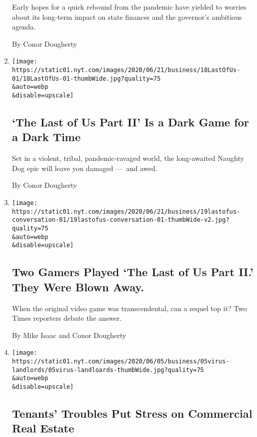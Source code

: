 \begin{enumerate}
  Early hopes for a quick rebound from the pandemic have yielded to
  worries about its long-term impact on state finances and the
  governor's ambitious agenda.

  By Conor Dougherty
\item
  \href{/2020/06/19/business/last-of-us-2-review.html}{}

  \texttt{[image: https://static01.nyt.com/images/2020/06/21/business/18LastOfUs-01/18LastOfUs-01-thumbWide.jpg?quality=75\\\&auto=webp\\\&disable=upscale]}

  \hypertarget{the-last-of-us-part-ii-is-a-dark-game-for-a-dark-time}{%
  \subsection{`The Last of Us Part II' Is a Dark Game for a Dark
  Time}\label{the-last-of-us-part-ii-is-a-dark-game-for-a-dark-time}}

  Set in a violent, tribal, pandemic-ravaged world, the long-awaited
  Naughty Dog epic will leave you damaged ---~and awed.

  By Conor Dougherty
\item
  \href{/2020/06/19/technology/last-of-us-2-gameplay.html}{}

  \texttt{[image: https://static01.nyt.com/images/2020/06/21/business/19lastofus-conversation-01/19lastofus-conversation-01-thumbWide-v2.jpg?quality=75\\\&auto=webp\\\&disable=upscale]}

  \hypertarget{two-gamers-played-the-last-of-us-part-ii-they-were-blown-away}{%
  \subsection{Two Gamers Played `The Last of Us Part II.' They Were
  Blown
  Away.}\label{two-gamers-played-the-last-of-us-part-ii-they-were-blown-away}}

  When the original video game was transcendental, can a sequel top it?
  Two Times reporters debate the answer.

  By Mike Isaac and Conor Dougherty
\item
  \href{/2020/06/05/business/economy/coronavirus-commercial-real-estate.html}{}

  \texttt{[image: https://static01.nyt.com/images/2020/06/05/business/05virus-landlords/05virus-landloards-thumbWide.jpg?quality=75\\\&auto=webp\\\&disable=upscale]}

  \hypertarget{tenants-troubles-put-stress-on-commercial-real-estate}{%
  \subsection{Tenants' Troubles Put Stress on Commercial Real
  Estate}\label{tenants-troubles-put-stress-on-commercial-real-estate}}


\end{enumerate}
